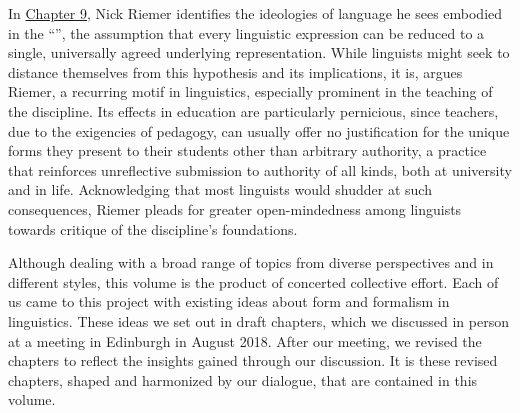 \documentclass[output=paper]{langscibook}
\begin{document}
In \hyperref[chap:riemer]{Chapter 9}, Nick Riemer identifies the ideologies of language he sees embodied in the ``'', the assumption that every linguistic expression can be reduced to a single, universally agreed underlying representation. While linguists might seek to distance themselves from this hypothesis and its implications, it is, argues Riemer, a recurring motif in linguistics, especially prominent in the teaching of the discipline. Its effects in education are particularly pernicious, since teachers, due to the exigencies of pedagogy, can usually offer no justification for the unique forms they present to their students other than arbitrary authority, a practice that reinforces unreflective submission to authority of all kinds, both at university and in life. Acknowledging that most linguists would shudder at such consequences, Riemer pleads for greater open-mindedness among linguists towards critique of the discipline's foundations.

Although dealing with a broad range of topics from diverse perspectives and in different styles, this volume is the product of concerted collective effort. Each of us came to this project with existing ideas about form and formalism in linguistics. These ideas we set out in draft chapters, which we discussed in person at a meeting in Edinburgh in August 2018. After our meeting, we revised the chapters to reflect the insights gained through our discussion. It is these revised chapters, shaped and harmonized by our dialogue, that are contained in this volume. 

\sloppy
\printbibliography[heading=subbibliography]
\end{document}
